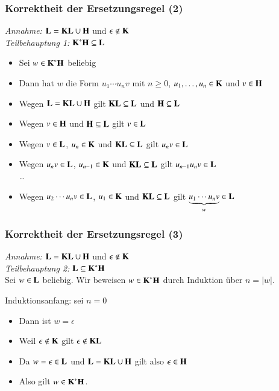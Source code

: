 \documentclass[aspectratio=1610,onlymath]{beamer}
\begin{document}
\begin{frame}[t]\frametitle{Korrektheit der Ersetzungsregel (2)}

\emph{Annahme:} $\Slang{L}= \Slang{K}\Slang{L}\cup\Slang{H}$ und $\epsilon\notin\Slang{K}$\\[1ex]

\emph{Teilbehauptung 1:} $\Slang{K}^*\Slang{H}\subseteq\Slang{L}$\pause\\[1ex]

\begin{itemize}
\item Sei $w\in \Slang{K}^*\Slang{H}$ beliebig\pause
\item Dann hat $w$ die Form $u_1\cdots u_n v$ mit $n\geq 0$, $u_1,\ldots,u_n\in\Slang{K}$ und $v\in\Slang{H}$\pause
\item Wegen $\Slang{L}= \Slang{K}\Slang{L}\cup\Slang{H}$ gilt $\Slang{K}\Slang{L}\subseteq\Slang{L}$ und $\Slang{H}\subseteq\Slang{L}$\pause
\item Wegen $v\in\Slang{H}$ und $\Slang{H}\subseteq\Slang{L}$ gilt $v\in\Slang{L}$\pause
\item Wegen $v\in\Slang{L}$, $u_n\in\Slang{K}$ und $\Slang{K}\Slang{L}\subseteq\Slang{L}$ gilt $u_n v\in\Slang{L}$\pause
\item Wegen $u_n v\in\Slang{L}$, $u_{n-1}\in\Slang{K}$ und $\Slang{K}\Slang{L}\subseteq\Slang{L}$ gilt $u_{n-1} u_n v\in\Slang{L}$\pause\\
\ldots
\item Wegen $u_2\cdots u_n v\in\Slang{L}$, $u_1\in\Slang{K}$ und $\Slang{K}\Slang{L}\subseteq\Slang{L}$ gilt $\underbrace{u_1\cdots u_n v}_w\in\Slang{L}$
\end{itemize}

\end{frame}

\begin{frame}[t]\frametitle{Korrektheit der Ersetzungsregel (3)}

\emph{Annahme:} $\Slang{L}= \Slang{K}\Slang{L}\cup\Slang{H}$ und $\epsilon\notin\Slang{K}$\\[1ex]

\emph{Teilbehauptung 2:} $\Slang{L}\subseteq\Slang{K}^*\Slang{H}$\pause\\[1ex]

Sei $w\in \Slang{L}$ beliebig. Wir beweisen $w\in\Slang{K}^*\Slang{H}$ durch Induktion über $n=|w|$.
\medskip

\alert{Induktionsanfang:} sei $n=0$\pause
\begin{itemize}
\item Dann ist $w=\epsilon$\pause
\item Weil $\epsilon\notin\Slang{K}$ gilt $\epsilon\notin\Slang{K}\Slang{L}$\pause
\item Da $w=\epsilon\in\Slang{L}$ und $\Slang{L}= \Slang{K}\Slang{L}\cup\Slang{H}$ gilt also $\epsilon\in\Slang{H}$\pause
\item Also gilt $w\in\Slang{K}^*\Slang{H}$.
\end{itemize}

\end{frame}
\end{document}
